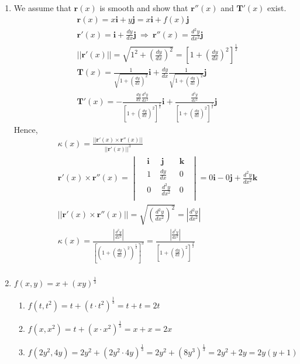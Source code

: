 \documentclass[12pt]{amsart}
\begin{document}
\begin{enumerate}
	\item We assume that $\mathbf{r}(x)$ is smooth and show that $\mathbf{r}''(x)$ and $\mathbf{T}'(x)$ exist.
		\begin{align*}
			&\mathbf{r}(x)=x\mathbf{i}+y\mathbf{j}=x\mathbf{i}+f(x)\mathbf{j} \\
			&\mathbf{r}'(x)=\mathbf{i}+\frac{dy}{dx}\mathbf{j} \ \Rightarrow \ \mathbf{r}''(x)=\frac{d^2y}{dx^2}\mathbf{j} \\
			&||\mathbf{r}'(x)||=\sqrt{1^2+\left(\frac{dy}{dx}\right)^2}=\left[1+\left(\frac{dy}{dx}\right)^2\right]^{\frac{1}{2}} \\
			&\mathbf{T}(x)=\frac{1}{\sqrt{1+\left(\frac{dy}{dx}\right)^2}}\mathbf{i}+\frac{dy}{dx}\frac{1}{\sqrt{1+\left(\frac{dy}{dx}\right)^2}}\mathbf{j} \\		
			&\mathbf{T}'(x)=-\frac{\frac{dy}{dx}\frac{d^2y}{dx^2}}{\left[1+\left(\frac{dy}{dx}\right)^2\right]^{\frac{3}{2}}}\mathbf{i} 		
			+\frac{\frac{d^2y}{dx^2}}{\left[1+\left(\frac{dy}{dx}\right)^2\right]^{\frac{3}{2}}}\mathbf{j}
		\end{align*}
		Hence,
			\begin{align*}
				&\kappa(x)=\frac{||\mathbf{r}'(x)\times \mathbf{r}''(x)||}{||\mathbf{r}'(x)||^3} \\
				&\mathbf{r}'(x)\times \mathbf{r}''(x)=
					\begin{vmatrix}
						&\mathbf{i} \ &\ \mathbf{j} \ &\mathbf{k} \ \ \\
						&1 \ &\frac{dy}{dx} \ &0 \ \ \\
						&0 \ &\ \frac{d^2y}{dx^2} \ &0 \ \ \\
					\end{vmatrix} 
					=0\mathbf{i}-0\mathbf{j}+\frac{d^2y}{dx^2}\mathbf{k} \\
					&||\mathbf{r}'(x)\times \mathbf{r}''(x)||=\sqrt{\left(\frac{d^2y}{dx^2}\right)^2}=\left|\frac{d^2y}{dx^2}\right| \\													
					&\kappa(x)=\frac{\left|\frac{d^2y}{dx^2}\right|}{\left[\left(1+\left(\frac{dy}{dx}\right)^2\right)^{\frac{1}{2}}\right]^3}=\frac{\left|\frac{d^2y}{dx^2}\right|}  
					{\left[1+\left(\frac{dy}{dx}\right)^2\right]^{\frac{3}{2}}} \\
			\end{align*}
			
	\item $f(x,y)=x+(xy)^{\frac{1}{3}}$
		\begin{enumerate}
			\item $f(t,t^2)=t+(t\cdot t^2)^{\frac{1}{3}}=t+t=2t$
			\item $f(x,x^2)=t+(x\cdot x^2)^{\frac{1}{3}}=x+x=2x$
			\item $f(2y^2,4y)=2y^2+(2y^2\cdot 4y)^{\frac{1}{3}}=2y^2+(8y^3)^{\frac{1}{3}}=2y^2+2y=2y(y+1)$ \\
		\end{enumerate}
	

\end{enumerate}
\end{document}
